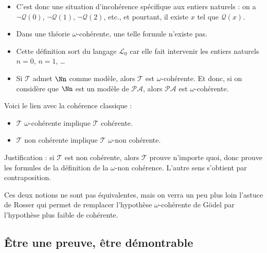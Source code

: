 \documentclass[11pt,class=report,crop=false]{standalone}
\begin{document}
\begin{itemize}
    \item C'est donc une situation d'incohérence spécifique aux entiers naturels : on a $\lnot\mathcal{Q}(0)$, $\lnot\mathcal{Q}(1)$, $\lnot\mathcal{Q}(2)$, etc., et pourtant, il existe $x$ tel que $\mathcal{Q}(x)$.

    \item Dans une théorie $\omega$-cohérente, une telle formule n'existe pas.
    
    \item Cette définition sort du langage $\mathcal{L}_0$ car elle fait intervenir les entiers naturels $n=0$, $n=1$, \ldots

    \item Si $\mathcal{T}$ admet $\Nn$ comme modèle, alors $\mathcal{T}$ est $\omega$-cohérente. Et donc, si on considère que $\Nn$ est un modèle de $\mathcal{PA}$, alors $\mathcal{PA}$ est $\omega$-cohérente.
\end{itemize}


Voici le lien avec la cohérence classique :
\begin{itemize}
    \item $\mathcal{T}$ $\omega$-cohérente implique $\mathcal{T}$ cohérente.
    \item $\mathcal{T}$ non cohérente implique $\mathcal{T}$ $\omega$-non cohérente.
\end{itemize}

Justification : si $\mathcal{T}$ est non cohérente, alors $\mathcal{T}$ prouve n'importe quoi, donc prouve les formules de la définition de la $\omega$-non cohérence. L'autre sens s'obtient par contraposition.

Ces deux notions ne sont pas équivalentes, mais on verra un peu plus loin l'astuce de Rosser qui permet de remplacer l'hypothèse \og{}$\omega$-cohérente\fg{} de Gödel par l'hypothèse plus faible de \og{}cohérente\fg{}.



\subsection{Être une preuve, être démontrable}
\end{document}
